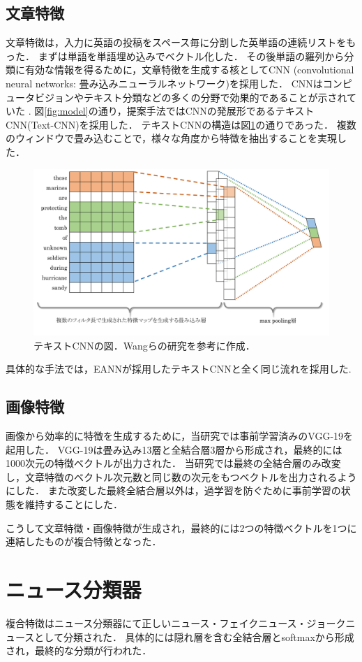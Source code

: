 \subsection{文章特徴}
文章特徴は，入力に英語の投稿をスペース毎に分割した英単語の連続リストをもった．
まずは単語を単語埋め込みでベクトル化した．
その後単語の羅列から分類に有効な情報を得るために，文章特徴を生成する核としてCNN
(convolutional neural networks: 畳み込みニューラルネットワーク)を採用した．
CNNはコンピュータビジョンやテキスト分類などの多くの分野で効果的であることが示されていた
\cite{collobert2011natural,kalchbrenner2014convolutional}.
図\ref{fig:model}の通り，提案手法ではCNNの発展形であるテキストCNN(Text-CNN)\cite{kim2014convolutional}を採用した．
テキストCNNの構造は図\ref{fig:text-cnn}の通りであった．
複数のウィンドウで畳み込むことで，様々な角度から特徴を抽出することを実現した．
\begin{figure}[H]
    \centering
    \includegraphics[width=\linewidth]{images/text-cnn.pdf}
    \caption{テキストCNNの図．Wangらの研究\cite{wang2018eann}を参考に作成．}
    \label{fig:text-cnn}
\end{figure}

具体的な手法では，EANNが採用したテキストCNNと全く同じ流れを採用した\cite{wang2018eann}.
%
\subsection{画像特徴}
画像から効率的に特徴を生成するために，当研究では事前学習済みのVGG-19\cite{simonyan2014very}を起用した．
VGG-19は畳み込み13層と全結合層3層から形成され，最終的には1000次元の特徴ベクトルが出力された．
当研究では最終の全結合層のみ改変し，文章特徴のベクトル次元数と同じ数の次元をもつベクトルを出力されるようにした．
また改変した最終全結合層以外は，過学習を防ぐために事前学習の状態を維持することにした．

こうして文章特徴・画像特徴が生成され，最終的には2つの特徴ベクトルを1つに連結したものが複合特徴となった．
%
\section{ニュース分類器}
%
複合特徴はニュース分類器にて正しいニュース・フェイクニュース・ジョークニュースとして分類された．
具体的には隠れ層を含む全結合層とsoftmaxから形成され，最終的な分類が行われた．




%
%
\newpage
%
%
%
%
%
%
%
%
%
%
% 